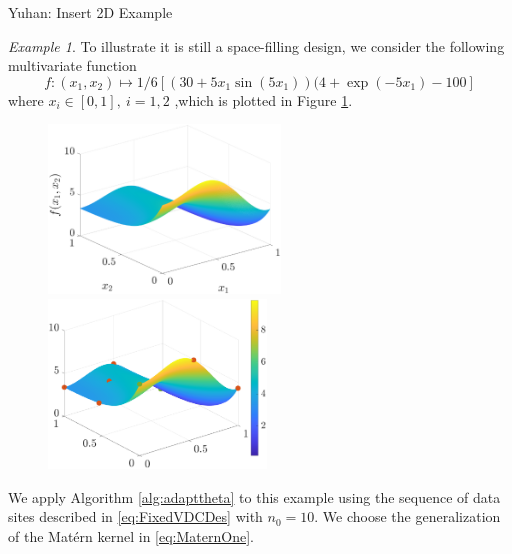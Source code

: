 \documentclass[]{mcom-l}
\theoremstyle{theorem}
\theoremstyle{remark}
\newtheorem{example}{Example}
\newcommand{\YuhanNote}[1]{{\color{magenta}Yuhan: #1}}
\begin{document}
\YuhanNote{Insert 2D Example}
\begin{example}
\label{ex:limfun}
To illustrate it is still a space-filling design,  we consider the following multivariate function
	\begin{equation}
	f: (x_1,x_2) \mapsto 
 1/6\left[(30+5x_1\sin(5x_1))
    (4+\exp(-5x_1)-100\right] 
	\end{equation}
	where $x_i \in [0,1], \  i=1,2$ ,which is plotted in Figure \ref{fig:LimFun}. 
		
	\begin{figure}[H]
		\centering
		\includegraphics[height = 4.5cm]{ProgramsImages/LimFunPlot.eps} \qquad
		\includegraphics[height = 4.5cm]{ProgramsImages/Alg3_LimFun_SpatialMatern_adapt_th_EmpBayesAx_theta_1.eps} \qquad		
		\caption{ \label{fig:LimFun}}
	\end{figure}
	We apply Algorithm \ref{alg:adapttheta} to this example using the sequence of data sites described in \eqref{eq:FixedVDCDes} with $n_0=10$. We choose the generalization of the Mat\'ern kernel in \eqref{eq:MaternOne}.
	


		
	

\end{example}
\end{document}
